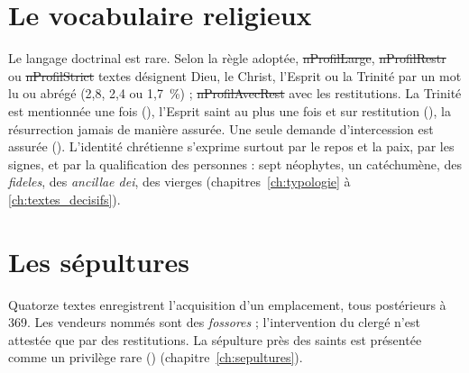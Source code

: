 \section{Le vocabulaire religieux}

Le langage doctrinal est rare. Selon la règle adoptée, \st{nProfilLarge}, \st{nProfilRestr} ou \st{nProfilStrict} textes désignent Dieu, le Christ, l’Esprit ou la Trinité par un mot lu ou abrégé (2,8, 2,4 ou 1,7~\%) ; \st{nProfilAvecRest} avec les restitutions. La Trinité est mentionnée une fois (), l’Esprit saint au plus une fois et sur restitution (), la résurrection jamais de manière assurée. Une seule demande d’intercession est assurée (). L’identité chrétienne s’exprime surtout par le repos et la paix, par les signes, et par la qualification des personnes : sept néophytes, un catéchumène, des \emph{fideles}, des \emph{ancillae dei}, des vierges (chapitres~\ref{ch:typologie} à \ref{ch:textes_decisifs}).

\section{Les sépultures}

Quatorze textes enregistrent l’acquisition d’un emplacement, tous postérieurs à 369. Les vendeurs nommés sont des \emph{fossores} ; l’intervention du clergé n’est attestée que par des restitutions. La sépulture près des saints est présentée comme un privilège rare () (chapitre~\ref{ch:sepultures}).

